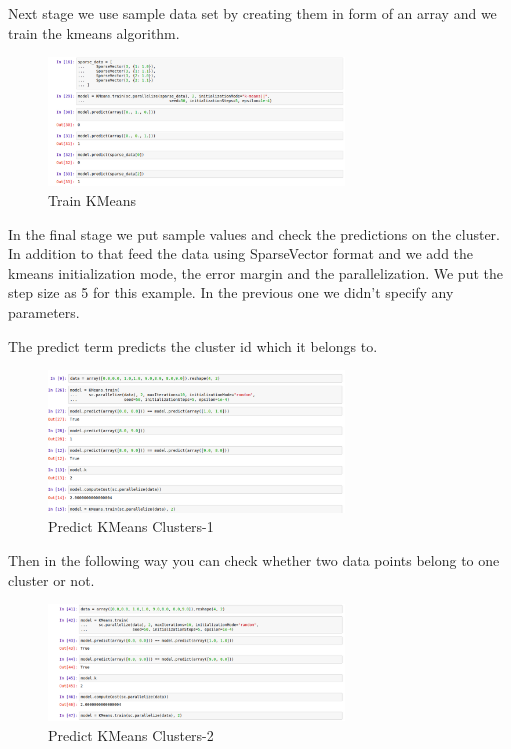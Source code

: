 Next stage we use sample data set by creating them in form of an array
and we train the kmeans algorithm.

\begin{figure}[htbp]
\centering
\includegraphics[width=0.7\textwidth]{images/docker-spark-tut-4.png}
\caption{Train KMeans}
\end{figure}

In the final stage we put sample values and check the predictions on the
cluster. In addition to that feed the data using SparseVector format and
we add the kmeans initialization mode, the error margin and the
parallelization. We put the step size as 5 for this example. In the
previous one we didn't specify any parameters.

The predict term predicts the cluster id which it belongs to.

\begin{figure}[htbp]
\centering
\includegraphics[width=0.7\textwidth]{images/docker-spark-tut-5.png}
\caption{Predict KMeans Clusters-1}
\end{figure}

Then in the following way you can check whether two data points belong
to one cluster or not.

\begin{figure}[htbp]
\centering
\includegraphics[width=0.7\textwidth]{images/docker-spark-tut-2.png}
\caption{Predict KMeans Clusters-2}
\end{figure}

